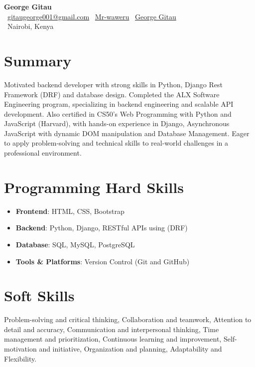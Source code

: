 \documentclass[letterpaper,11pt]{article}
\newcommand{\resumeSubHeadingListStart}{\begin{itemize}[leftmargin=*]}
\newcommand{\resumeSubHeadingListEnd}{\end{itemize}}
\begin{document}
\begin{center}
    {\huge \textbf{George Gitau}} \\
    \smallskip
     \faEnvelope\ \href{mailto:gitaugeorge001@gmail.com}{gitaugeorge001@gmail.com} \quad
     \faGithub\ \href{https://github.com/Mr-waweru}{Mr-waweru} \quad
     \faLinkedin\ \href{https://www.linkedin.com/in/mr-gitau/}{George Gitau} \\
    \smallskip
     \faMapMarker\ Nairobi, Kenya \quad
\end{center}
\smallskip

\section*{Summary}
Motivated backend developer with strong skills in Python, Django Rest Framework (DRF) and database design. Completed the ALX Software Engineering program, specializing in backend engineering and scalable API development. Also certified in CS50’s Web Programming with Python and JavaScript (Harvard), with hands-on experience in Django, Asynchronous JavaScript with dynamic DOM manipulation and Database
Management. Eager to apply problem-solving and technical skills to real-world challenges in a professional environment.

\section*{Programming Hard Skills}
\resumeSubHeadingListStart
  \item{
    \textbf{Frontend}{: HTML, CSS, Bootstrap}
  }
  \item{
    \textbf{Backend}{: Python, Django, RESTful APIs using (DRF)}
  }
  \item{
    \textbf{Database}{: SQL, MySQL, PostgreSQL}
  }
  \item{
    \textbf{Tools \& Platforms}{: Version Control (Git and GitHub)}
  }
\resumeSubHeadingListEnd

\section*{Soft Skills}
Problem-solving and critical thinking, Collaboration and teamwork, Attention to detail and accuracy, Communication and interpersonal thinking, Time management and prioritization, Continuous learning and improvement, Self-motivation and initiative, Organization and planning, Adaptability and Flexibility.
\end{document}
